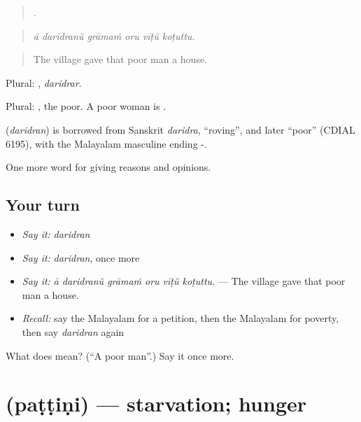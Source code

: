 \begin{quote}
     .
\end{quote}

\begin{quote}
\emph{ā daridranŭ grāmaṁ oru vīṭŭ koṭuttu.}
\end{quote}

\begin{quote}
The village gave that poor man a house.
\end{quote}

Plural: , \emph{daridrar}.

Plural: , the poor. A poor woman is .

\begin{cousinweb}
\textbf{} (\emph{daridran}) is borrowed from Sanskrit \emph{daridra}, \textquotedblleft{}roving\textquotedblright{}, and later \textquotedblleft{}poor\textquotedblright{} (CDIAL 6195), with the Malayalam masculine ending -.
\end{cousinweb}

\begin{grammarlens}[title={What you've built}]
One more word for giving reasons and opinions.
\end{grammarlens}

\subsection*{Your turn}
\begin{itemize}
\raggedright
  \item \emph{Say it:} \emph{daridran}
  \item \emph{Say it:} \emph{daridran}, once more
  \item \emph{Say it:} \emph{ā daridranŭ grāmaṁ oru vīṭŭ koṭuttu.} — The village gave that poor man a house.
  \item \emph{Recall:} say the Malayalam for a petition, then the Malayalam for poverty, then say \emph{daridran} again
\end{itemize}

\begin{tcolorbox}[breakable,colback=teal!4,colframe=teal!35!black,title={Before you move on}]
What does  mean? (\textquotedblleft{}A poor man\textquotedblright{}.) Say it once more.
\end{tcolorbox}
\section[\texorpdfstring{\ml{പട്ടിണി} (paṭṭiṇi)}{പട്ടിണി (paṭṭiṇi)}]{ (paṭṭiṇi) — starvation; hunger}

